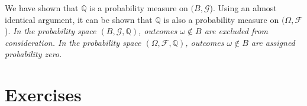 \begin{remark}
We have shown that $\mathbb{Q}$ is a probability measure on $(B,\mathcal{G}$). Using an almost identical argument, it can be shown that $\mathbb{Q}$ is also a probability measure on $(\Omega,\mathcal{F}$).  
\bit
\it In the probability space $(B,\mathcal{G},\mathbb{Q})$, outcomes $\omega\notin B$ are excluded from consideration.
\it In the probability space $(\Omega,\mathcal{F},\mathbb{Q})$, outcomes $\omega\notin B$ are assigned probability zero.
\eit
\end{remark}


\newpage
\section{Exercises}


\endinput
